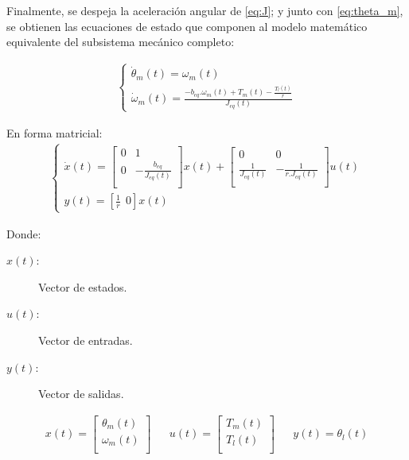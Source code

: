 \documentclass{article}
\begin{document}
\begin{sloppypar}
Finalmente, se despeja la aceleración angular de \ref{eq:J}; y junto con \ref{eq:theta_m}, se obtienen las ecuaciones de estado que componen al modelo matemático equivalente del subsistema mecánico completo:

\begin{align} \label{eq:subsistema mecánico completo}
    \begin{cases}
        \dot{\theta}_m\left(t\right)=\omega_m\left(t\right)
        \\
        \dot{\omega}_m\left(t\right)=\frac{ -b_{eq}.\omega_m(t)+T_m\left(t\right)-\frac{T_l\left(t\right)}{r} }{ J_{eq}(t) }
    \end{cases}
\end{align}


En forma matricial:
\begin{align} \label{eq:subsistema mecánico completo en forma matricial}
    \begin{cases}
        \dot{x}\left(t\right)=\left[\begin{matrix}0&1\\0&-\frac{b_{eq}}{J_{eq}(t)}\\\end{matrix}\right]x\left(t\right)+\left[\begin{matrix}0&0\\\frac{1}{J_{eq}(t)}&-\frac{1}{{r.J}_{eq}(t)}\\\end{matrix}\right]u\left(t\right)
        \\
        y\left(t\right)=\left[\frac{1}{r}\ \ 0\right]x\left(t\right)
    \end{cases}
\end{align}

Donde:
\begin{description}
	\item[$x(t):$] Vector de estados.
	\item[$u(t):$] Vector de entradas.
	\item[$y(t):$] Vector de salidas.
\end{description}

\begin{align}  \label{eq:vectores de estados, entradas y salidas}
    x(t)=\left[\begin{matrix}\theta_m\left(t\right)\\\omega_m\left(t\right)\\\end{matrix}\right]
    &&
    u(t)=\left[\begin{matrix}T_m\left(t\right)\\T_l\left(t\right)\\\end{matrix}\right]
    &&
    y(t)=\theta_l\left(t\right)
\end{align}


\end{sloppypar}
\end{document}
